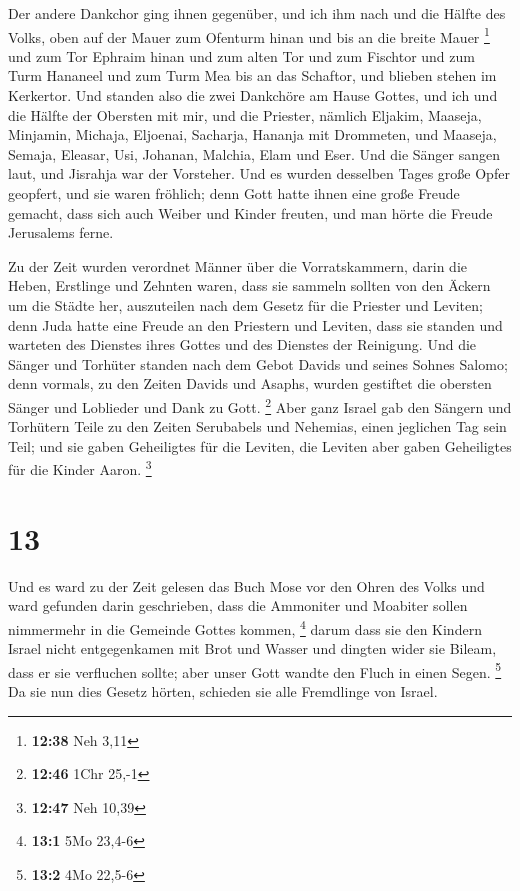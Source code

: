  Der andere Dankchor ging ihnen gegenüber, und ich ihm
nach und die Hälfte des Volks, oben auf der Mauer zum Ofenturm hinan und
bis an die breite Mauer \footnote{\textbf{12:38} Neh 3,11}
 und zum Tor Ephraim hinan und zum alten Tor und zum
Fischtor und zum Turm Hananeel und zum Turm Mea bis an das Schaftor, und
blieben stehen im Kerkertor.  Und standen also die zwei
Dankchöre am Hause Gottes, und ich und die Hälfte der Obersten mit mir,
 und die Priester, nämlich Eljakim, Maaseja, Minjamin,
Michaja, Eljoenai, Sacharja, Hananja mit Drommeten,  und
Maaseja, Semaja, Eleasar, Usi, Johanan, Malchia, Elam und Eser. Und die
Sänger sangen laut, und Jisrahja war der Vorsteher.  Und
es wurden desselben Tages große Opfer geopfert, und sie waren fröhlich;
denn Gott hatte ihnen eine große Freude gemacht, dass sich auch Weiber
und Kinder freuten, und man hörte die Freude Jerusalems ferne.

 Zu der Zeit wurden verordnet Männer über die
Vorratskammern, darin die Heben, Erstlinge und Zehnten waren, dass sie
sammeln sollten von den Äckern um die Städte her, auszuteilen nach dem
Gesetz für die Priester und Leviten; denn Juda hatte eine Freude an den
Priestern und Leviten, dass sie standen  und warteten des
Dienstes ihres Gottes und des Dienstes der Reinigung. Und die Sänger und
Torhüter standen nach dem Gebot Davids und seines Sohnes Salomo;
 denn vormals, zu den Zeiten Davids und Asaphs, wurden
gestiftet die obersten Sänger und Loblieder und Dank zu Gott.
\footnote{\textbf{12:46} 1Chr 25,-1}  Aber ganz Israel
gab den Sängern und Torhütern Teile zu den Zeiten Serubabels und
Nehemias, einen jeglichen Tag sein Teil; und sie gaben Geheiligtes für
die Leviten, die Leviten aber gaben Geheiligtes für die Kinder Aaron.
\footnote{\textbf{12:47} Neh 10,39}

\hypertarget{section-2}{%
\section{13}\label{section-2}}

 Und es ward zu der Zeit gelesen das Buch Mose vor den
Ohren des Volks und ward gefunden darin geschrieben, dass die Ammoniter
und Moabiter sollen nimmermehr in die Gemeinde Gottes kommen,
\footnote{\textbf{13:1} 5Mo 23,4-6}  darum dass sie den
Kindern Israel nicht entgegenkamen mit Brot und Wasser und dingten wider
sie Bileam, dass er sie verfluchen sollte; aber unser Gott wandte den
Fluch in einen Segen. \footnote{\textbf{13:2} 4Mo 22,5-6} 
Da sie nun dies Gesetz hörten, schieden sie alle Fremdlinge von Israel.

